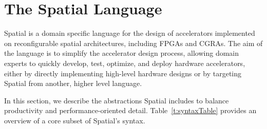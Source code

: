 \section{The Spatial Language}
\label{language}

Spatial is a domain specific language for the design of accelerators implemented on reconfigurable spatial architectures, including FPGAs and CGRAs.
The aim of the language is to simplify the accelerator design process,
allowing domain experts to quickly develop, test, optimize, and deploy hardware accelerators, either by
directly implementing high-level hardware designs or by targeting Spatial from another, higher level language.

In this section, we describe the abstractions Spatial includes to balance productivity and performance-oriented detail.
Table~\ref{t:syntaxTable} provides an overview of a core subset of Spatial's syntax.







